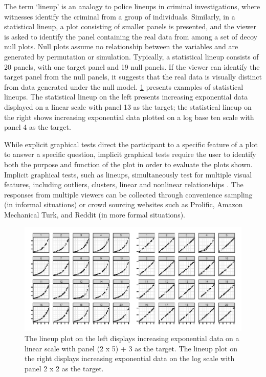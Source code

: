 \documentclass[12pt]{article}
\begin{document}
The term `lineup' is an analogy to police lineups in criminal
investigations, where witnesses identify the criminal from a group of
individuals. Similarly, in a statistical lineup, a plot consisting of
smaller panels is presented, and the viewer is asked to identify the
panel containing the real data from among a set of decoy null plots.
Null plots assume no relationship between the variables and are
generated by permutation or simulation. Typically, a statistical lineup
consists of 20 panels, with one target panel and 19 null panels. If the
viewer can identify the target panel from the null panels, it suggests
that the real data is visually distinct from data generated under the
null model. \cref{fig:lineup-example} presents examples of statistical
lineups. The statistical lineup on the left presents increasing
exponential data displayed on a linear scale with panel 13 as the
target; the statistical lineup on the right shows increasing exponential
data plotted on a log base ten scale with panel 4 as the target.

While explicit graphical tests direct the participant to a specific
feature of a plot to answer a specific question, implicit graphical
tests require the user to identify both the purpose and function of the
plot in order to evaluate the plots shown. Implicit graphical tests,
such as lineups, simultaneously test for multiple visual features,
including outliers, clusters, linear and nonlinear relationships
\citep{vanderplas_testing_2020}. The responses from multiple viewers can
be collected through convenience sampling (in informal situations) or
crowd sourcing websites such as Prolific, Amazon Mechanical Turk, and
Reddit (in more formal situations).

\begin{figure}[tbp]

{\centering \includegraphics[width=\linewidth,]{logarithmic-lineups_files/figure-latex/lineup-example-1} 

}

\caption[Lineup examples]{The lineup plot on the left displays increasing exponential data on a linear scale with panel (2 x 5) + 3 as the target. The lineup plot on the right displays increasing exponential data on the log scale with panel 2 x 2 as the target.}\label{fig:lineup-example}
\end{figure}
\end{document}

